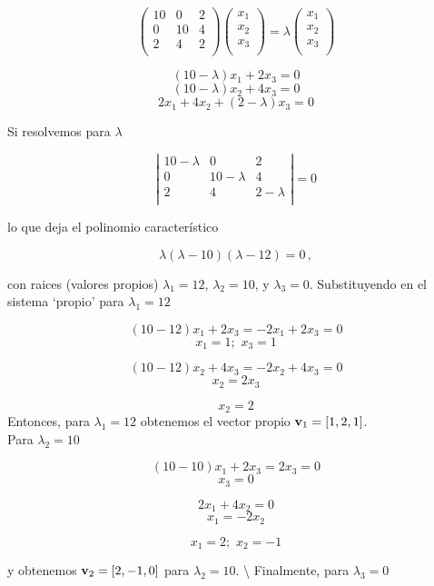 \documentclass[
]{agujournal2019}
\begin{document}
\[\left(\begin{array}{ccc}
  10 & 0 & 2 \\
  0 & 10 & 4\\
  2 & 4 & 2\\
      \end{array}\right)\left(\begin{array}{c}
  x_1 \\
  x_2 \\
  x_3 \\
      \end{array}\right)=\lambda \left(\begin{array}{c}
  x_1 \\
  x_2 \\
  x_3 \\
      \end{array}\right)\]

\[(10-\lambda)x_1 + 2x_3=0\] \[(10-\lambda)x_2 + 4x_3=0\]
\[2x_1 + 4x_2 + (2-\lambda)x_3=0\]

Si resolvemos para \(\lambda\)

\[\left|\begin{array}{ccc}
  10-\lambda & 0 & 2 \\
  0 & 10-\lambda & 4\\
  2 & 4 & 2-\lambda\\
      \end{array}\right|=0\]

lo que deja el polinomio característico

\[\lambda (\lambda-10)(\lambda-12)=0\,,\]

con raices (valores propios) \(\lambda_1=12\), \(\lambda_2=10\), y
\(\lambda_3=0\). Substituyendo en el sistema `propio' para
\(\lambda_1=12\)

\[(10-12)x_1 + 2x_3 = -2x_1+2x_3=0\] \[x_1=1;\,\,x_3=1\]

\[(10-12)x_2 + 4x_3 = -2x_2+4x_3=0\] \[x_2=2x_3\]

\[x_2=2\] Entonces, para \(\lambda_1=12\) obtenemos el vector propio
\({\textbf v}_1=[1,2,1]\).\\

Para \(\lambda_2=10\)

\[(10-10)x_1 + 2x_3=2x_3=0\] \[x_3=0\]

\[2x_1+4x_2=0\] \[x_1=-2x_2\]

\[x_1=2;\,\,x_2=-1\]

y obtenemos \({\textbf v}_2=[2,-1,0]\) para \(\lambda_2=10\).
\textbackslash{} Finalmente, para \(\lambda_3=0\)
\end{document}
